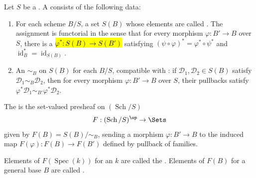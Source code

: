 \begin{definition} \label{definition:moduli_functor_on_schemes}
Let $S$ be a . A  consists of the following data:
\begin{enumerate}
    \item For each scheme $B/S$, a set $S(B)$ whose elements are called . The assignment is functorial in the sense that for every morphism $\varphi: B' \to B$ over $S$, there is a  \hl{$\varphi^*: S(B) \to S(B')$} satisfying $(\psi \circ \varphi)^* = \varphi^* \circ \psi^*$ and $\operatorname{id}_B^* = \operatorname{id}_{S(B)}$.

    \item An  $\sim_B$ on $S(B)$ for each $B/S$, compatible with : if $\mathcal{D}_1, \mathcal{D}_2 \in S(B)$ satisfy $\mathcal{D}_1 \sim_B \mathcal{D}_2$, then for every morphism $\varphi: B' \to B$ over $S$, their pullbacks satisfy $\varphi^*\mathcal{D}_1 \sim_{B'} \varphi^*\mathcal{D}_2$.
\end{enumerate}

The  is the set-valued presheaf on $(\operatorname{Sch}/S)$
$$ F: (\operatorname{Sch}/S)^{\op} \to \Sets $$
given by $F(B) = S(B)/\sim_B$, sending a morphism $\varphi: B' \to B$ to the induced map $F(\varphi): F(B) \to F(B')$ defined by pullback of families.

Elements of $F(\operatorname{Spec}(k))$ for an  $k$ are called the . Elements of $F(B)$ for a general base $B$ are called .
\end{definition}
